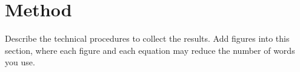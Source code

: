 \section{Method}
\label{sec:method}
Describe the technical procedures to collect the results.
Add figures into this section, where
each figure and each equation may reduce the number of words you use.